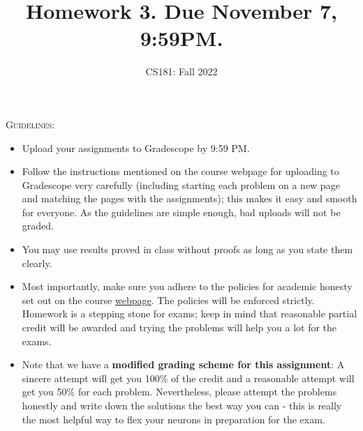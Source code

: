 \documentclass[11pt]{article}
\title{\bf{Homework 3. Due November 7, 9:59PM.}}
\author{ CS181: Fall 2022}
\date{}
\begin{document}
\maketitle
\begin{mdframed}
\textsc{Guidelines}:
\begin{itemize}
\item Upload your assignments to Gradescope by 9:59 PM. 
\item Follow the instructions mentioned on the course webpage for uploading to Gradescope very carefully (including starting each problem on a new page and matching the pages with the assignments); this makes it easy and smooth for everyone. As the guidelines are simple enough, bad uploads will not be graded. 
\item You may use results proved in class without proofs as long as you state them clearly.
\item Most importantly, make sure you adhere to the policies for academic honesty set out on the course \href{https://hackmd.io/@raghum/introtcs}{webpage}. The policies will be enforced strictly. Homework is a stepping stone for exams; keep in mind that reasonable partial credit will be awarded and trying the problems will help you a lot for the exams.
\item Note that we have a {\bf modified grading scheme for this assignment}: A sincere attempt will get you 100\% of the credit and a reasonable attempt will get you 50\% for each problem. Nevertheless, please attempt the problems honestly and write down the solutions the best way you can - this is really the most helpful way to flex your neurons in preparation for the exam.
\end{itemize}
\end{mdframed}
\end{document}
